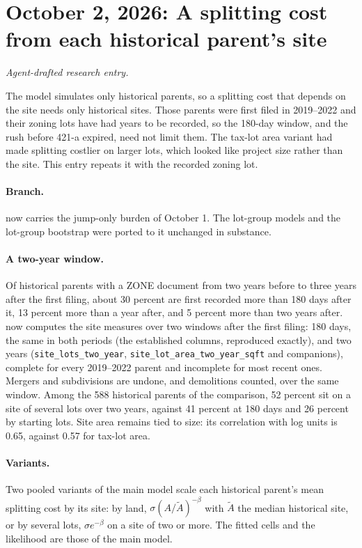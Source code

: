 \clearpage
\section*{October 2, 2026: A splitting cost from each historical parent's site}
\textit{Agent-drafted research entry.}

The model simulates only historical parents, so a splitting cost that depends on
the site needs only historical sites. Those parents were first filed in
2019--2022 and their zoning lots have had years to be recorded, so the 180-day
window, and the rush before 421-a expired, need not limit them. The tax-lot
area variant had made splitting costlier on larger lots, which looked like
project size rather than the site. This entry repeats it with the recorded
zoning lot.

\paragraph{Branch.}  now carries the jump-only burden
of October 1. The lot-group models and the lot-group bootstrap were ported to
it unchanged in substance.

\paragraph{A two-year window.} Of historical parents with a ZONE document from
two years before to three years after the first filing, about 30 percent are
first recorded more than 180 days after it, 13 percent more than a year after,
and 5 percent more than two years after. 
now computes the site measures over two windows after the first filing: 180
days, the same in both periods (the established columns, reproduced exactly),
and two years (\texttt{site\_lots\_two\_year},
\texttt{site\_lot\_area\_two\_year\_sqft} and companions), complete for every
2019--2022 parent and incomplete for most recent ones. Mergers and subdivisions
are undone, and demolitions counted, over the same window. Among the 588
historical parents of the comparison, 52 percent sit on a site of several lots
over two years, against 41 percent at 180 days and 26 percent by starting lots.
Site area remains tied to size: its correlation with log units is 0.65,
against 0.57 for tax-lot area.

\paragraph{Variants.} Two pooled variants of the main model scale each
historical parent's mean splitting cost by its site: by land,
$\sigma(A/\tilde A)^{-\beta}$ with $\tilde A$ the median historical site, or by
several lots, $\sigma e^{-\beta}$ on a site of two or more. The fitted cells and
the likelihood are those of the main model.

